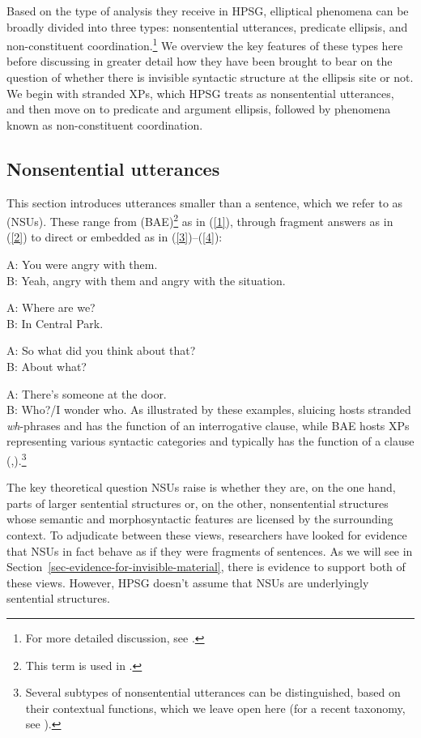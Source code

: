 {Based on the type of analysis they receive in HPSG, elliptical phenomena can be broadly divided into three types:
         nonsentential utterances, predicate ellipsis, and non-constituent coordination.\footnote{For more detailed discussion, see \citet{Kim2020}.}
          We overview the key features of these types here before discussing in greater detail how they have been brought to bear on the question of whether there is invisible syntactic structure at the ellipsis site or not. We begin with stranded XPs, which HPSG treats as nonsentential utterances, and then move on to predicate and argument ellipsis, followed by phenomena known as non-constituent coordination.


\subsection{Nonsentential utterances}
This section introduces utterances smaller than a sentence, which we refer to as \emph{} (NSUs). These range from \emph{} (BAE)\footnote{This term is used in \citet{CJ2005a}.} as in (\ref{1}), through fragment answers as in (\ref{2})
to direct or embedded  as in (\ref{3})--(\ref{4}):

\ea A: You were angry with them.\\ B: Yeah, angry with them and angry with the situation.\label{1}\z

\ea A: Where are we? \\B: In Central Park.\label{2}\z

\ea A: So what did you think about that?\\ B: About what? \label{3}\z

\ea A: There's someone at the door. \\B: Who?/I wonder who. \label{4}\z
%
As illustrated by these examples, sluicing hosts stranded \emph{wh}-phrases and has the function of an interrogative clause, while BAE hosts XPs representing various syntactic categories and typically has the function of a clause (\citealt[313]{Ginzburg:Sag:2000},\citealt[233]{CJ2005a}).\footnote{Several subtypes of nonsentential utterances can be distinguished, based on their contextual functions, which we leave open here (for a recent taxonomy, see \citealt[217]{Ginzburg2012}).}

The key theoretical question NSUs raise is whether they are, on the one hand, parts of larger sentential structures or, on the other, nonsentential structures whose semantic and morphosyntactic features are licensed by the surrounding context. To adjudicate between these views, researchers have looked for evidence that NSUs in fact behave as if they were fragments of sentences. As we will see in Section~\ref{sec-evidence-for-invisible-material}, there is evidence to support both of these views. However, HPSG doesn't assume that NSUs are underlyingly sentential structures.

}
